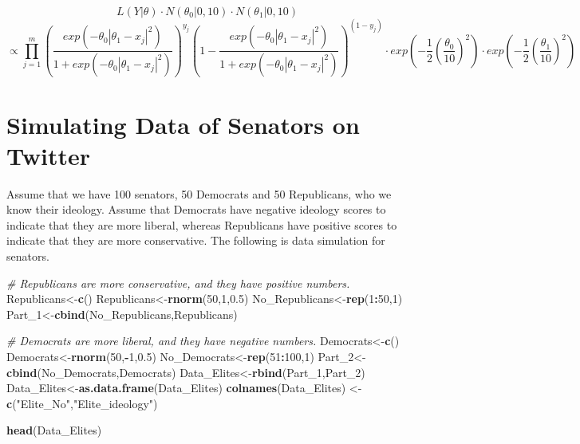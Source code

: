 \documentclass[]{book}
\newenvironment{Shaded}{\begin{snugshade}}{\end{snugshade}}
\newcommand{\KeywordTok}[1]{\textcolor[rgb]{0.13,0.29,0.53}{\textbf{#1}}}
\newcommand{\DecValTok}[1]{\textcolor[rgb]{0.00,0.00,0.81}{#1}}
\newcommand{\FloatTok}[1]{\textcolor[rgb]{0.00,0.00,0.81}{#1}}
\newcommand{\StringTok}[1]{\textcolor[rgb]{0.31,0.60,0.02}{#1}}
\newcommand{\CommentTok}[1]{\textcolor[rgb]{0.56,0.35,0.01}{\textit{#1}}}
\newcommand{\OperatorTok}[1]{\textcolor[rgb]{0.81,0.36,0.00}{\textbf{#1}}}
\newcommand{\NormalTok}[1]{#1}
\begin{document}
\[L(Y|\theta) \cdot N(\theta_0|0,10) \cdot N(\theta_1|0,10)\]
\[\propto \prod_{j=1}^{m} (\frac{exp(- \theta_0|\theta_1 - x_j|^2)}{1+exp(- \theta_0|\theta_1 - x_j|^2)})^{y_j}(1-\frac{exp(- \theta_0|\theta_1 - x_j|^2)}{1+exp(- \theta_0|\theta_1 - x_j|^2)})^{(1-y_j)}\cdot exp(-\frac{1}{2}(\frac{\theta_0}{10})^2)\cdot exp(-\frac{1}{2}(\frac{\theta_1}{10})^2)\]

\section{Simulating Data of Senators on
Twitter}\label{simulating-data-of-senators-on-twitter}

Assume that we have 100 senators, 50 Democrats and 50 Republicans, who
we know their ideology. Assume that Democrats have negative ideology
scores to indicate that they are more liberal, whereas Republicans have
positive scores to indicate that they are more conservative. The
following is data simulation for senators.

\begin{Shaded}
\begin{Highlighting}[]
\CommentTok{# Republicans are more conservative, and they have positive numbers.}
\NormalTok{Republicans<-}\KeywordTok{c}\NormalTok{()}
\NormalTok{Republicans<-}\KeywordTok{rnorm}\NormalTok{(}\DecValTok{50}\NormalTok{,}\DecValTok{1}\NormalTok{,}\FloatTok{0.5}\NormalTok{)}
\NormalTok{No_Republicans<-}\KeywordTok{rep}\NormalTok{(}\DecValTok{1}\OperatorTok{:}\DecValTok{50}\NormalTok{,}\DecValTok{1}\NormalTok{)}
\NormalTok{Part_}\DecValTok{1}\NormalTok{<-}\KeywordTok{cbind}\NormalTok{(No_Republicans,Republicans)}

\CommentTok{# Democrats are more liberal, and they have negative numbers.}
\NormalTok{Democrats<-}\KeywordTok{c}\NormalTok{()}
\NormalTok{Democrats<-}\KeywordTok{rnorm}\NormalTok{(}\DecValTok{50}\NormalTok{,}\OperatorTok{-}\DecValTok{1}\NormalTok{,}\FloatTok{0.5}\NormalTok{)}
\NormalTok{No_Democrats<-}\KeywordTok{rep}\NormalTok{(}\DecValTok{51}\OperatorTok{:}\DecValTok{100}\NormalTok{,}\DecValTok{1}\NormalTok{)}
\NormalTok{Part_}\DecValTok{2}\NormalTok{<-}\KeywordTok{cbind}\NormalTok{(No_Democrats,Democrats)}
\NormalTok{Data_Elites<-}\KeywordTok{rbind}\NormalTok{(Part_}\DecValTok{1}\NormalTok{,Part_}\DecValTok{2}\NormalTok{)}
\NormalTok{Data_Elites<-}\KeywordTok{as.data.frame}\NormalTok{(Data_Elites)}
\KeywordTok{colnames}\NormalTok{(Data_Elites) <-}\StringTok{ }\KeywordTok{c}\NormalTok{(}\StringTok{"Elite_No"}\NormalTok{,}\StringTok{"Elite_ideology"}\NormalTok{)}

\KeywordTok{head}\NormalTok{(Data_Elites)}
\end{Highlighting}
\end{Shaded}
\end{document}
